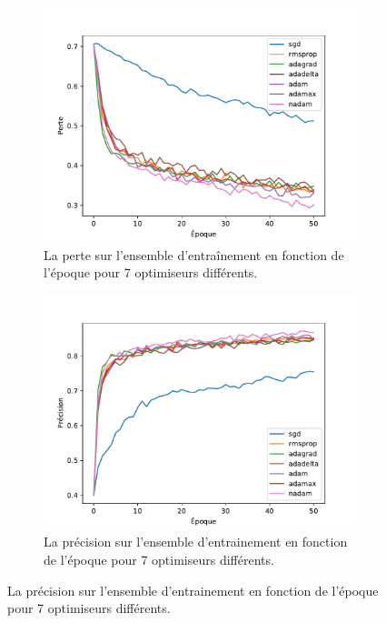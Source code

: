 \documentclass{article}
\begin{document}
\begin{figure}[H]
	\centering
	\begin{subfigure}{.48\textwidth}
		\centering
		\includegraphics[scale=0.42]{imgs/compare_loss.pdf}
		\caption{La perte sur l'ensemble d'entraînement en fonction de l'époque pour 7 optimiseurs différents.}
	\end{subfigure}
	\hspace{0.2cm}
	\begin{subfigure}{.48\textwidth}
		\centering
		\includegraphics[scale=0.42]{imgs/compare_train_acc.pdf}
		\caption{La précision sur l'ensemble d'entrainement en fonction de l'époque pour 7 optimiseurs différents.}
	\end{subfigure}

\end{figure}
\end{document}

